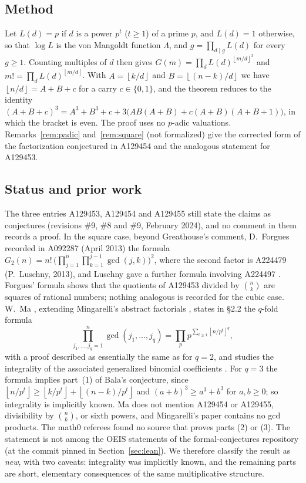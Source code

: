 \documentclass[11pt]{amsart}
\theoremstyle{plain}
\theoremstyle{definition}
\newcommand{\fl}[1]{\left\lfloor #1\right\rfloor}
\begin{document}
\subsection*{Method}
Let $L(d)=p$ if $d$ is a power $p^t$ ($t\ge1$) of a prime $p$, and $L(d)=1$ otherwise, so that $\log L$ is the von Mangoldt function $\Lambda$, and $g=\prod_{d\mid g}L(d)$ for every $g\ge1$. Counting multiples of $d$ then gives $G(m)=\prod_{d}L(d)^{\fl{m/d}^3}$ and $m!=\prod_dL(d)^{\fl{m/d}}$. With $A=\fl{k/d}$ and $B=\fl{(n-k)/d}$ we have $\fl{n/d}=A+B+c$ for a carry $c\in\{0,1\}$, and the theorem reduces to the identity $(A+B+c)^3=A^3+B^3+c+3\bigl(AB(A+B)+c(A+B)(A+B+1)\bigr)$, in which the bracket is even. The proof uses no $p$-adic valuations. Remarks~\ref{rem:padic} and~\ref{rem:square} (not formalized) give the corrected form of the factorization conjectured in A129454 and the analogous statement for A129453.

\subsection*{Status and prior work}
The three entries A129453, A129454 and A129455 still state the claims as conjectures (revisions \#9, \#8 and \#9, February 2024), and no comment in them records a proof.
In the square case, beyond Greathouse's comment, D.~Forgues recorded in A092287 (April 2013) the formula $G_2(n)=n!\,\bigl(\prod_{j=1}^n\prod_{k=1}^{j-1}\gcd(j,k)\bigr)^2$, where the second factor is A224479 \cite{A224479} (P.~Luschny, 2013), and Luschny gave a further formula involving A224497 \cite{A224497}. Forgues' formula shows that the quotients of A129453 divided by $\binom nk$ are squares of rational numbers; nothing analogous is recorded for the cubic case.
W.~Ma \cite{Ma}, extending Mingarelli's abstract factorials \cite{Mi}, states in \S2.2 the $q$-fold formula
\[
  \prod_{j_1,\dots,j_q=1}^{n}\gcd(j_1,\dots,j_q)=\prod_{p}p^{\sum_{t\ge1}\fl{n/p^t}^q},
\]
with a proof described as essentially the same as for $q=2$, and studies the integrality of the associated generalized binomial coefficients \cite[Theorems~2.5--2.6]{Ma}. For $q=3$ the formula implies part~(1) of Bala's conjecture, since $\fl{n/p^t}\ge\fl{k/p^t}+\fl{(n-k)/p^t}$ and $(a+b)^3\ge a^3+b^3$ for $a,b\ge0$; so integrality is implicitly known. Ma does not mention A129454 or A129455, divisibility by $\binom nk$, or sixth powers, and Mingarelli's paper contains no gcd products.
The math0 referees found no source that proves parts (2) or (3).
The statement is not among the OEIS statements of the formal-conjectures repository \cite{FC} (at the commit pinned in Section~\ref{sec:lean}).
We therefore classify the result as \emph{new}, with two caveats: integrality was implicitly known, and the remaining parts are short, elementary consequences of the same multiplicative structure.
\end{document}
